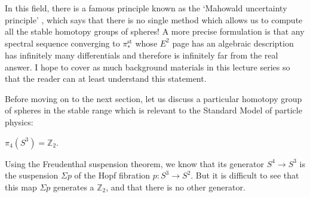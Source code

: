 \documentclass[12pt]{article}
\numberwithin{equation}{section}
\numberwithin{figure}{section}
\theoremstyle{remark}
\def\bZ{\mathbb{Z}}
\begin{document}
In this field, there is a famous principle known as the 
`Mahowald uncertainty principle' \cite[Sec.~3]{IsaksenICM},
which says 
that there is no single method 
which allows us to compute all the stable homotopy groups of spheres!
A more precise formulation is that 
any spectral sequence converging to $\pi^\text{st}_*$ 
whose $E^2$ page has an algebraic description 
has infinitely many differentials 
and therefore is infinitely far from the real answer.
I hope to cover as much background materials in this lecture series so that 
the reader can at least understand this statement.

Before moving on to the next section,
let us discuss a particular homotopy group of spheres in the stable range
which is relevant to the Standard Model of particle physics:
\begin{example}
  $\pi_4(S^3)=\bZ_2$.
\end{example}
Using the Freudenthal suspension theorem,
we know that its generator $S^4\to S^3$ is the suspension $\Sigma p$
of the Hopf fibration $p:S^3\to S^2$.
But it is difficult to see that this map $\Sigma p$ 
generates a $\bZ_2$, and that there is no other generator.
  
\end{document}

